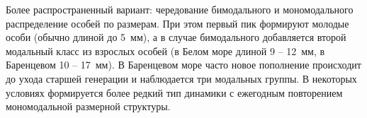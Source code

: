 \begin{enumerate}
Более распространенный вариант: чередование бимодального и мономодального распределение особей по размерам. При этом первый пик формируют молодые особи (обычно длиной до 5~мм), а в случае бимодального добавляется второй модальный класс из взрослых особей (в Белом море длиной 9 -- 12~мм, в Баренцевом 10 -- 17~мм). В Баренцевом море часто новое пополнение происходит до ухода старшей генерации и наблюдается три модальных группы. %
В некоторых условиях формируется более редкий тип динамики с ежегодным повторением мономодальной размерной структуры. %
	\end{enumerate}

